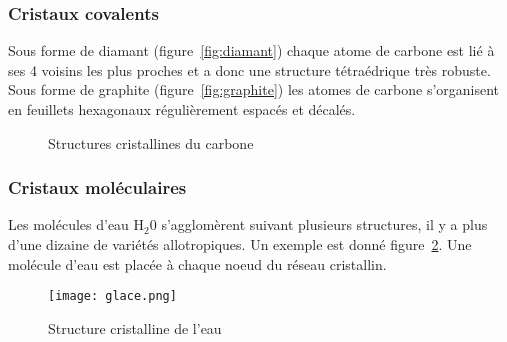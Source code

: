 \subsubsection*{Cristaux covalents}
\begin{ex}
    Sous forme de diamant (figure~\ref{fig:diamant}) chaque atome de
    carbone est lié à ses 4 voisins les plus proches et a donc une
    structure tétraédrique très robuste.\\
    Sous forme de graphite (figure~\ref{fig:graphite}) les atomes de
    carbone s'organisent en feuillets hexagonaux régulièrement
    espacés et décalés.
\end{ex}
\begin{figure}
    \centering
    \qquad
    \caption{Structures cristallines du carbone}\label{fig:carbone}
\end{figure}

\subsubsection*{Cristaux moléculaires}
\begin{ex}[Eau]
    Les molécules d'eau H$_2$0 s'agglomèrent suivant plusieurs structures,
    il y a plus d'une dizaine de variétés allotropiques. Un exemple
    est donné figure~\ref{fig:glace}. Une molécule d'eau est placée
    à chaque noeud du réseau cristallin.
\end{ex}
\begin{figure}
    \centering
    \texttt{[image: glace.png]}
    \caption{Structure cristalline de l'eau}\label{fig:glace}
\end{figure}

